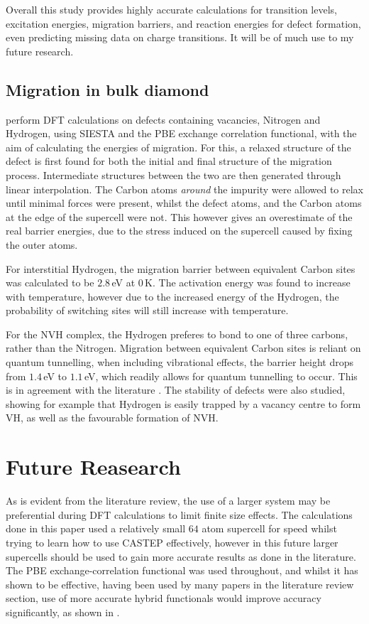 \documentclass[10pt,a4paper,twocolumn,twoside]{extarticle}
\begin{document}
Overall this study provides highly accurate calculations for transition levels, excitation energies, migration barriers, and reaction energies for defect formation, even predicting missing data on charge transitions. It will be of much use to my future research.

\subsection{Migration in bulk diamond}
\textcite{butorac} perform DFT calculations on defects containing vacancies, Nitrogen and Hydrogen, using SIESTA and the PBE exchange correlation functional, with the aim of calculating the energies of migration. For this, a relaxed structure of the defect is first found for both the initial and final structure of the migration process. Intermediate structures between the two are then generated through linear interpolation. The Carbon atoms \emph{around} the impurity were allowed to relax until minimal forces were present, whilst the defect atoms, and the Carbon atoms at the edge of the supercell were not. This however gives an overestimate of the real barrier energies, due to the stress induced on the supercell caused by fixing the outer atoms.

For interstitial Hydrogen, the migration barrier between equivalent Carbon sites was calculated to be $2.8$\,eV at $0$\,K. The activation energy was found to increase with temperature, however due to the increased energy of the Hydrogen, the probability of switching sites will still increase with temperature.

For the NVH complex, the Hydrogen preferes to bond to one of three carbons, rather than the Nitrogen. Migration between equivalent Carbon sites is reliant on quantum tunnelling, when including vibrational effects, the barrier height drops from $1.4$\,eV to $1.1$\,eV, which readily allows for quantum tunnelling to occur. This is in agreement with the literature \cite{Shaw_QT_VH}.
The stability of defects were also studied, showing for example that Hydrogen is easily trapped by a vacancy centre to form VH, as well as the favourable formation of NVH. 

\section{Future Reasearch}
\label{sec:future}
As is evident from the literature review, the use of a larger system may be preferential during DFT calculations to limit finite size effects. The calculations done in this paper used a relatively small $64$ atom supercell for speed whilst trying to learn how to use CASTEP effectively, however in this future larger supercells should be used to gain more accurate results as done in the literature.
The PBE exchange-correlation functional was used throughout, and whilst it has shown to be effective, having been used by many papers in the literature review section, use of more accurate hybrid functionals would improve accuracy significantly, as shown in \cite{Deak}. 
\end{document}
